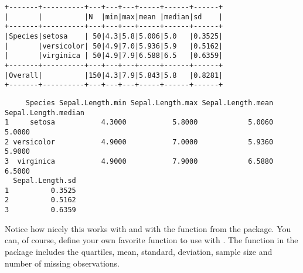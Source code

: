 \begin{knitrout}
{\begin{kframe}
\begin{verbatim}
+-------+----------+---+---+---+-----+------+------+
|       |          |N  |min|max|mean |median|sd    |
+-------+----------+---+---+---+-----+------+------+
|Species|setosa    | 50|4.3|5.8|5.006|5.0   |0.3525|
|       |versicolor| 50|4.9|7.0|5.936|5.9   |0.5162|
|       |virginica | 50|4.9|7.9|6.588|6.5   |0.6359|
+-------+----------+---+---+---+-----+------+------+
|Overall|          |150|4.3|7.9|5.843|5.8   |0.8281|
+-------+----------+---+---+---+-----+------+------+
\end{verbatim}
\begin{flushleft}
\ttfamily\noindent
{}\hlkeyword{(}\hlkeyword{\urltilda{}}{\ }\hlkeyword{,}{\ }\hlargument{=}{\ }\hlkeyword{,}{\ }\hlargument{=}{\ }\hlkeyword{)}\mbox{}
\normalfont
\end{flushleft}
\begin{verbatim}
     Species Sepal.Length.min Sepal.Length.max Sepal.Length.mean Sepal.Length.median
1     setosa           4.3000           5.8000            5.0060              5.0000
2 versicolor           4.9000           7.0000            5.9360              5.9000
3  virginica           4.9000           7.9000            6.5880              6.5000
  Sepal.Length.sd
1          0.3525
2          0.5162
3          0.6359
\end{verbatim}
\end{kframe}}
\end{knitrout}


Notice how nicely this works with  and with the  
function from the  package.
You can, of course, define your own favorite function to use with .
%
The  function in the  package includes the 
quartiles, mean, standard, deviation, sample size and number of missing observations.
%
\begin{knitrout}
\end{knitrout}


